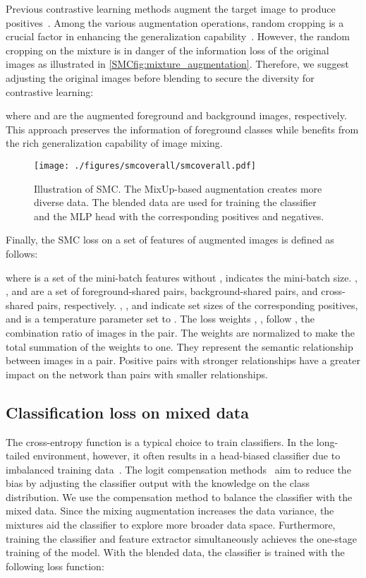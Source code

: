 \documentclass[10pt,twocolumn,letterpaper]{article}
\begin{document}
Previous contrastive learning methods augment the target image to produce positives~\cite{chen2020simple, khosla2020supervised}. Among the various augmentation operations, random cropping is a crucial factor in enhancing the generalization capability~\cite{chen2020simple}. However, the random cropping on the mixture is in danger of the information loss of the original images as illustrated in \cref{SMCfig:mixture_augmentation}.
Therefore, we suggest adjusting the original images before blending to secure the diversity for contrastive learning:

where  and  are the augmented foreground and background images, respectively.
This approach preserves the information of foreground classes while benefits from the rich generalization capability of image mixing.



\begin{figure*}[t]
    \centering
    \texttt{[image: ./figures/smcoverall/smcoverall.pdf]}
    \caption{Illustration of SMC. The MixUp-based augmentation creates more diverse data. The blended data are used for training the classifier and the MLP head with the corresponding positives and negatives.}
    \label{SMCfig:overall}
\end{figure*}


Finally, the SMC loss  on a set of features of augmented images  is defined as follows:

where  is a set of the mini-batch features without ,  indicates the mini-batch size.
, , and  are a set of foreground-shared pairs, background-shared pairs, and cross-shared pairs, respectively. , , and  indicate set sizes of the corresponding positives, and  is a temperature parameter set to .
The loss weights , ,  follow , the combination ratio of images in the pair.
The weights are normalized to make the total summation of the weights to one.
They represent the semantic relationship between images in a pair.
Positive pairs with stronger relationships have a greater impact on the network than pairs with smaller relationships.


\subsection{Classification loss on mixed data}
The cross-entropy function is a typical choice to train classifiers. In the long-tailed environment, however, it often results in a head-biased classifier due to imbalanced training data~\cite{ren2020balanced}.
The logit compensation methods~\cite{CIFAR-LT, menon2020long} aim to reduce the bias by adjusting the classifier output with the knowledge on the class distribution.
We use the compensation method to balance the classifier with the mixed data.
Since the mixing augmentation increases the data variance, the mixtures aid the classifier to explore more broader data space.
Furthermore, training the classifier and feature extractor simultaneously achieves the one-stage training of the model.
With the blended data, the classifier is trained with the following loss function:
\end{document}

